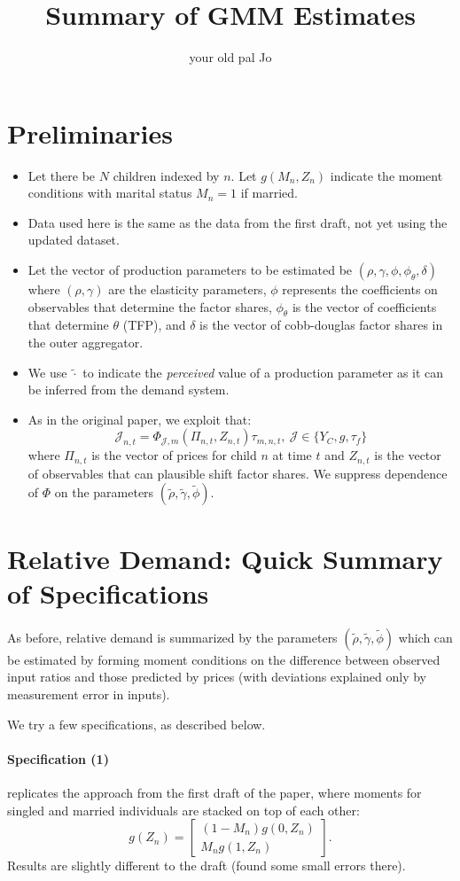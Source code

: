 \documentclass{article}
\title{Summary of GMM Estimates}
\author{your old pal Jo}
\begin{document}
\maketitle
\section*{Preliminaries}
\begin{itemize}
    \item Let there be $N$ children indexed by $n$. Let $g(M_{n},Z_{n})$ indicate the moment conditions with marital status $M_{n}=1$ if married.
    \item Data used here is the same as the data from the first draft, not yet using the updated dataset.
    \item Let the vector of production parameters to be estimated be $(\rho,\gamma,\phi,\phi_{\theta},\delta)$ where $(\rho,\gamma)$ are the elasticity parameters, $\phi$ represents the coefficients on observables that determine the factor shares, $\phi_{\theta}$ is the vector of coefficients that determine $\theta$ (TFP), and $\delta$ is the vector of cobb-douglas factor shares in the outer aggregator.
    \item We use $\tilde{\cdot}$ to indicate the \emph{perceived} value of a production parameter as it can be inferred from the demand system.
    \item As in the original paper, we exploit that:
     \[ \mathcal{J}_{n,t} = \Phi_{\mathcal{J},m}(\Pi_{n,t},Z_{n,t})\tau_{m,n,t},\ \mathcal{J}\in\{Y_{C},g,\tau_{f}\} \]
    where $\Pi_{n,t}$ is the vector of prices for child $n$ at time $t$ and $Z_{n,t}$ is the vector of observables that can plausible shift factor shares. We suppress dependence of $\Phi$ on the parameters $(\tilde{\rho},\tilde{\gamma},\tilde{\phi})$.
\end{itemize}

\section*{Relative Demand: Quick Summary of Specifications}
As before, relative demand is summarized by the parameters $(\tilde{\rho},\tilde{\gamma},\tilde{\phi})$ which can be estimated by forming moment conditions on the difference between observed input ratios and those predicted by prices (with deviations explained only by measurement error in inputs).

We try a few specifications, as described below.

\paragraph{Specification (1)} replicates the approach from the first draft of the paper, where moments for singled and married individuals are stacked on top of each other:
\[ g(Z_{n}) = \left[\begin{array}{c}(1-M_{n})g(0,Z_{n}) \\ M_{n} g(1,Z_{n})\end{array}\right].\]
Results are slightly different to the draft (found some small errors there).
\end{document}
